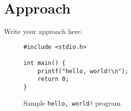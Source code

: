 \section{Approach}
\label{sec:approach}

Write your approach here.

\begin{figure}
\begin{verbatim}
#include <stdio.h>

int main() {
    printf("hello, world!\n");
    return 0;
}
\end{verbatim}
\caption{Sample {\tt hello, world!} program.}
\label{fig:hello_world}
\end{figure}
